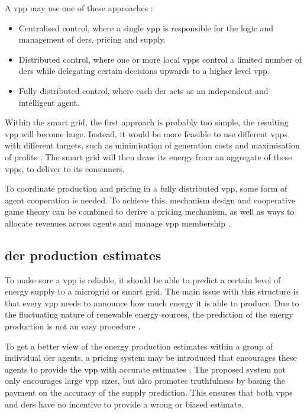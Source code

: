 A \ac{vpp} may use one of these approaches \cite{NikonowiczMilewski2012}:
\begin{itemize}
	\item Centralised control, where a single \ac{vpp} is responsible for the logic and management of \acp{der}, pricing and supply.
	\item Distributed control, where one or more local \acp{vpp} control a limited number of \acp{der} while delegating certain decisions upwards to a higher level \ac{vpp}.
	\item Fully distributed control, where each \ac{der} acts as an independent and intelligent agent.
\end{itemize}

Within the smart grid, the first approach is probably too simple, the resulting \ac{vpp} will become huge. Instead, it would be more feasible to use different \acp{vpp} with different targets, such as minimisation of generation costs and maximisation of profits \cite{LombardiPowalkoRudion2009}. The smart grid will then draw its energy from an aggregate of these \acp{vpp}, to deliver to its consumers. 

To coordinate production and pricing in a fully distributed \ac{vpp}, some form of agent cooperation is needed. To achieve this, mechanism design and cooperative game theory can be combined to derive a pricing mechanism, as well as ways to allocate revenues across agents and manage \ac{vpp} membership \cite{ChalkiadakisRobuKotaEtAl2011}. 

\subsection{\ac{der} production estimates}
\label{vpp:productionestimates}
To make sure a \ac{vpp} is reliable, it should be able to predict a certain level of energy supply to a microgrid or smart grid. The main issue with this structure is that every \ac{vpp} needs to announce how much energy it is able to produce. Due to the fluctuating nature of renewable energy sources, the prediction of the energy production is not an easy procedure \cite{LombardiPowalkoRudion2009}.  

To get a better view of the energy production estimates within a group of individual \ac{der} agents, a pricing system may be introduced that encourages these agents to provide the \ac{vpp} with accurate estimates \cite{ChalkiadakisRobuKotaEtAl2011}. The proposed system not only encourages large \ac{vpp} sizes, but also promotes truthfulness by basing the payment on the accuracy of the supply prediction. This ensures that both \acp{vpp} and \acp{der} have no incentive to provide a wrong or biased estimate.

